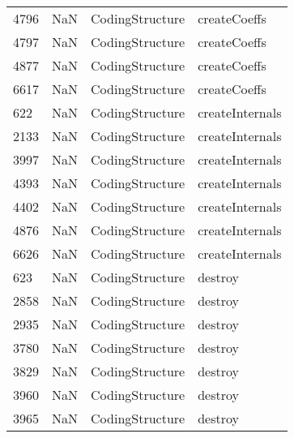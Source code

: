 \begin{tabular}{llll}
4796 &                   NaN &            CodingStructure &                              createCoeffs \\
4797 &                   NaN &            CodingStructure &                              createCoeffs \\
4877 &                   NaN &            CodingStructure &                              createCoeffs \\
6617 &                   NaN &            CodingStructure &                              createCoeffs \\
622  &                   NaN &            CodingStructure &                           createInternals \\
2133 &                   NaN &            CodingStructure &                           createInternals \\
3997 &                   NaN &            CodingStructure &                           createInternals \\
4393 &                   NaN &            CodingStructure &                           createInternals \\
4402 &                   NaN &            CodingStructure &                           createInternals \\
4876 &                   NaN &            CodingStructure &                           createInternals \\
6626 &                   NaN &            CodingStructure &                           createInternals \\
623  &                   NaN &            CodingStructure &                                   destroy \\
2858 &                   NaN &            CodingStructure &                                   destroy \\
2935 &                   NaN &            CodingStructure &                                   destroy \\
3780 &                   NaN &            CodingStructure &                                   destroy \\
3829 &                   NaN &            CodingStructure &                                   destroy \\
3960 &                   NaN &            CodingStructure &                                   destroy \\
3965 &                   NaN &            CodingStructure &                                   destroy \\

\end{tabular}
